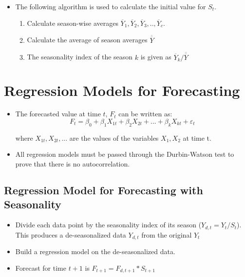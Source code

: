 \documentclass{article}
\theoremstyle{plain}
\theoremstyle{definition}
\begin{document}
\begin{itemize}
    \item The following algorithm is used to calculate the initial value for $S_t$.
    \begin{enumerate}
        \item Calculate season-wise averages $\overline{Y}_1,\overline{Y}_2, \overline{Y}_3,..,\overline{Y}_c$. 
        
        \item Calculate the average of season averages $\overline{\overline{Y}}$
        
        \item The seasonality index of the season $k$ is given as $\overline{Y}_k / \overline{\overline{Y}}$
    \end{enumerate}
\end{itemize}

\section{Regression Models for Forecasting}
\begin{itemize}
    \item The forecasted value at time $t$, $F_t$ can be written as:
    \begin{equation}
        F_t = \beta_0 + \beta_1 X_{1t} + \beta_2 X_{2t} + ... + \beta_k X_{kt} + \varepsilon_t
    \end{equation}
    
    where $X_{1t}, X_{2t},...$ are the values of the variables $X_1, X_2$ at time t. 
    
    \item All regression models must be passed through the Durbin-Watson test to prove that there is no autocorrelation. 
\end{itemize}

\subsection{Regression Model for Forecasting with Seasonality}
\begin{itemize}
    \item Divide each data point by the seasonality index of its season ($Y_{d, t} = Y_t/S_t$). This produces a de-seasonalized data $Y_{d,t}$ from the original $Y_t$
    
    \item Build a regression model on the de-seasonalized data.
    
    \item Forecast for time $t+1$ is $F_{t+1} = F_{d,t+1}*S_{t+1}$
\end{itemize}
\end{document}
